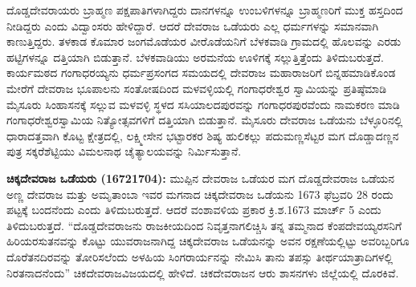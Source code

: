 ದೊಡ್ಡದೇವರಾಯರು ಬ್ರಾಹ್ಮಣ ಪಕ್ಷಪಾತಿಗಳಾಗಿದ್ದರು ದಾನಗಳನ್ನೂ ಉಂಬಳಿಗಳನ್ನೂ ಬ್ರಾಹ್ಮಣರಿಗೆ ಮುಕ್ತ ಹಸ್ತದಿಂದ ನೀಡಿದ್ದರು ಎಂದು ವಿದ್ವಾಂಸರು ಹೇಳಿದ್ದಾರೆ. ಆದರೆ ದೇವರಾಜ ಒಡೆಯರು ಎಲ್ಲ ಧರ್ಮಗಳನ್ನು ಸಮಾನವಾಗಿ ಕಾಣುತ್ತಿದ್ದರು. ತಳಕಾಡ ಕೊಮಾರ ಜಂಗಮೊಡೆಯರ ವೀರೊಡೆಯನಿಗೆ ಬೆಳಕವಾಡಿ ಗ್ರಾಮದಲ್ಲಿ ಹೊಲವನ್ನು ಎರಡು ಹಟ್ಟಿಗಳನ್ನೂ ದತ್ತಿಯಾಗಿ ಬಿಡುತ್ತಾನೆ. ಬೆಳಕವಾಡಿಯು ಅರಮನೆಯ ಊಳಿಗಕ್ಕೆ ಸಲ್ಲುತ್ತಿತ್ತೆಂದು ತಿಳಿದುಬರುತ್ತದೆ. ಕಾರ್ಯಮಠದ ಗಂಗಾಧರಯ್ಯನು ಧರ್ಮಪ್ರಸಂಗದ ಸಮಯದಲ್ಲಿ ದೇವರಾಜ ಮಹಾರಾಜರಿಗೆ ಬಿನ್ನಹಮಾಡಿಕೊಂಡ ಮೇರೆಗೆ ದೇವರಾಜ ಭೂಪಾಲನು ಸಂತೋಷದಿಂದ ಮಳವಳ್ಳಿಯಲ್ಲಿ ಗಂಗಾಧರೇಶ್ವರ ಸ್ವಾಮಿಯನ್ನು ಪ್ರತಿಷ್ಠೆಮಾಡಿ ಮೈಸೂರು ಸಿಂಹಾಸನಕ್ಕೆ ಸಲ್ಲುವ ಮಳವಳ್ಳಿ ಸ್ಥಳದ ಸಸಿಯಾಲದಪುರವನ್ನು ಗಂಗಾಧರಪುರವೆಂದು ನಾಮಕರಣ ಮಾಡಿ ಗಂಗಾಧರೇಶ್ವರ\-ಸ್ವಾಮಿಯ ನಿತ್ಯೋತ್ಸವಗಳಿಗೆ ದತ್ತಿಯಾಗಿ ಬಿಡುತ್ತಾನೆ. ಮೈಸೂರು ದೇವರಾಜ ಒಡೆಯನು ಬೆಳ್ಳೂರಿನಲ್ಲಿ ಧಾರಾದತ್ತವಾಗಿ ಕೊಟ್ಟ ಕ್ಷೇತ್ರದಲ್ಲಿ, ಲಕ್ಷ್ಮೀಸೇನ ಭಟ್ಟಾರಕರ ಶಿಷ್ಯ ಹುಲಿಕಲ್ಲು ಪದುಮಣ್ಣಸೆಟ್ಟರ ಮಗ ದೊಡ್ಡಾದಣ್ಣನ ಪುತ್ರ ಸಕ್ಕರೆಶೆಟ್ಟಿಯು ವಿಮಲನಾಥ ಚೈತ್ಯಾಲಯವನ್ನು ನಿರ್ಮಿಸುತ್ತಾನೆ.

\textbf{ಚಿಕ್ಕದೇವರಾಜ ಒಡೆಯರು (16721704):} ಮುಪ್ಪಿನ ದೇವರಾಜ ಒಡೆಯರ ಮಗ ದೊಡ್ಡದೇವರಾಜ ಒಡೆಯನ ಅಣ್ಣ ದೇವರಾಜ ಮತ್ತು ಅಮೃತಾಂಬಾ ಇವರ ಮಗನಾದ ಚಿಕ್ಕದೇವರಾಜ ಒಡೆಯನು 1673 ಫೆಬ್ರವರಿ 28 ರಂದು ಪಟ್ಟಕ್ಕೆ ಬಂದನೆಂದು ಎಂದು ತಿಳಿದುಬರುತ್ತದೆ. ಆದರೆ ವಂಶಾವಳಿಯ ಪ್ರಕಾರ ಕ್ರಿ.ಶ.1673 ಮಾರ್ಚ್ 5 ಎಂದು ತಿಳಿದುಬರುತ್ತದೆ. “ದೊಡ್ಡದೇವರಾಜನು ರಾಜಕೀಯದಿಂದ ನಿವೃತ್ತನಾಗಲಿಚ್ಚಿಸಿ ತನ್ನ ತಮ್ಮನಾದ ಕೆಂಪದೇವಯ್ಯರಸನಿಗೆ ಹಿರಿಯರಸುತನವನ್ನು ಕೊಟ್ಟು ಯುವರಾಜನಾಗಿದ್ದ ಚಿಕ್ಕದೇವರಾಜ ಒಡೆಯನನ್ನು ಅವನ ರಕ್ಷಣೆಯಲ್ಲಿಟ್ಟು ಅವರಿಬ್ಬರಿಗೂ ದೊರೆತನದಿರವನ್ನು ತೋರಿಸಲೆಂದು ಅಳಹಿಯ ಸಿಂಗರಾರ್ಯನನ್ನು ನೇಮಿಸಿ ತಾನು ತಪಸ್ಸು ತೀರ್ಥಯಾತ್ರಾದಿಗಳಲ್ಲಿ ನಿರತನಾದನೆಂದು” ಚಿಕದೇವರಾಜವಿಜಯದಲ್ಲಿ ಹೇಳಿದೆ. ಚಿಕದೇವರಾಜನ ಆರು ಶಾಸನಗಳು ಜಿಲ್ಲೆಯಲ್ಲಿ ದೊರಕಿವೆ. 

